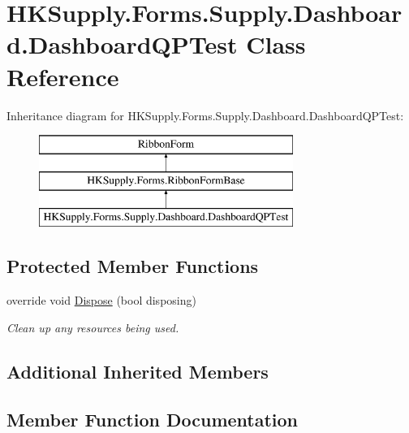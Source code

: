 \hypertarget{class_h_k_supply_1_1_forms_1_1_supply_1_1_dashboard_1_1_dashboard_q_p_test}{}\section{H\+K\+Supply.\+Forms.\+Supply.\+Dashboard.\+Dashboard\+Q\+P\+Test Class Reference}
\label{class_h_k_supply_1_1_forms_1_1_supply_1_1_dashboard_1_1_dashboard_q_p_test}
Inheritance diagram for H\+K\+Supply.\+Forms.\+Supply.\+Dashboard.\+Dashboard\+Q\+P\+Test\+:\begin{figure}[H]
\begin{center}
\leavevmode
\includegraphics[height=3.000000cm]{class_h_k_supply_1_1_forms_1_1_supply_1_1_dashboard_1_1_dashboard_q_p_test}
\end{center}
\end{figure}
\subsection*{Protected Member Functions}
\begin{DoxyCompactItemize}
\item 
override void \mbox{\hyperlink{class_h_k_supply_1_1_forms_1_1_supply_1_1_dashboard_1_1_dashboard_q_p_test_a216468de04747bec11d0cf504da06b04}{Dispose}} (bool disposing)
\begin{DoxyCompactList}\small\item\em Clean up any resources being used. \end{DoxyCompactList}\end{DoxyCompactItemize}
\subsection*{Additional Inherited Members}


\subsection{Member Function Documentation}
\mbox{\label{class_h_k_supply_1_1_forms_1_1_supply_1_1_dashboard_1_1_dashboard_q_p_test_a216468de04747bec11d0cf504da06b04}} 
